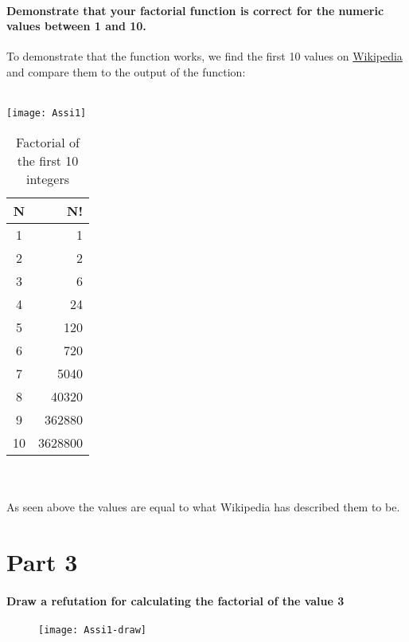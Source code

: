 \documentclass[Main]{subfiles}
\begin{document}
\paragraph{Demonstrate that your factorial function is correct for the numeric values between 1 and 10.}
To demonstrate that the function works, we find the first 10 values on \href{http://en.wikipedia.org/wiki/Factorial}{Wikipedia} and compare them to the output of the function:
\\
\\
\begin{minipage}{0.45\linewidth}
\texttt{[image: Assi1]}
\end{minipage}
\hspace{0.25cm}
\begin{minipage}{0.45\linewidth}

\begin{table}[H]
\centering
\begin{tabular}{cr}
\hline
N & N! \\ \hline
1 & 1 \\
2 & 2 \\
3 & 6 \\
4 & 24 \\
5 & 120 \\
6 & 720 \\
7 & 5040 \\
8 & 40320 \\
9 & 362880 \\
10 & 3628800 \\ \hline
\end{tabular}
\caption{Factorial of the first 10 integers}
\end{table}

\end{minipage}
\\
\\
As seen above the values are equal to what Wikipedia has described them to be.


\newpage
\section*{Part 3}
\paragraph{Draw a refutation for calculating the factorial of the value 3}

\begin{figure}[hbtp]
\texttt{[image: Assi1-draw]}
\end{figure}
\end{document}
